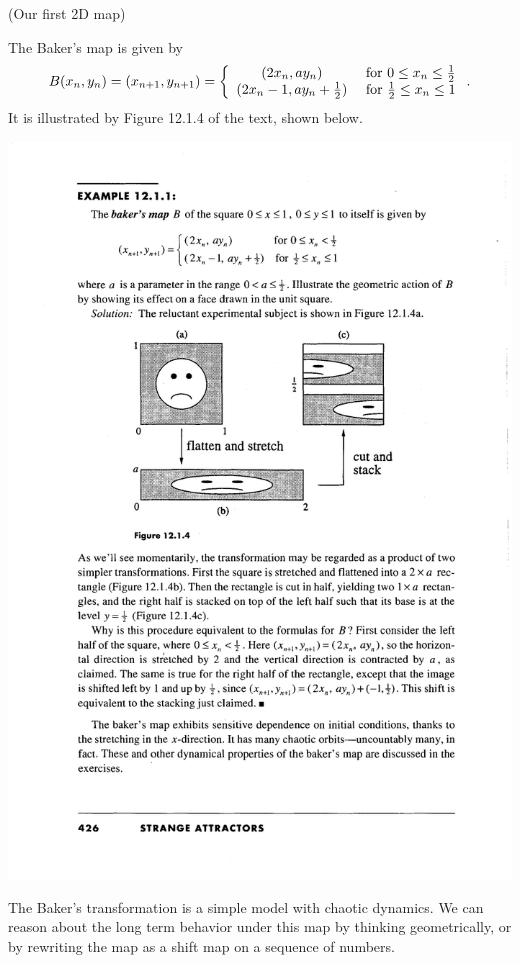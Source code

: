 \documentclass[12pt,letterpaper,noanswers]{exam}
\begin{document}
\begin{questions}




\question (Our first 2D map) 

The Baker's map is given by
\[B(x_n,y_n)= (x_{n+1},y_{n+1}) = \left\{ \begin{array}{c c} (2x_n, ay_n) &\mbox{ for } 0\leq x_n \leq \frac{1}{2} \\ (2x_n-1, ay_n+\frac{1}{2}) &\mbox{ for } \frac{1}{2} \leq x_n \leq 1 \end{array} \right. .\]  It is illustrated by Figure 12.1.4 of the text, shown below.

\includegraphics[scale=1]{img/C25baker.pdf}

The Baker's transformation is a simple model with chaotic dynamics.  We can reason about the long term behavior under this map by thinking geometrically, or by rewriting the map as a shift map on a sequence of numbers.


\end{questions}
\end{document}

